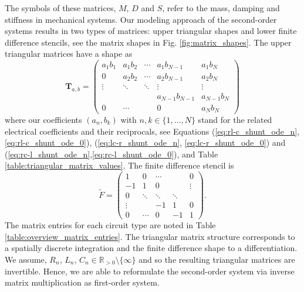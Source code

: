 \documentclass[a4paper, 10pt, twoside, twocolumn]{scrartcl}
\begin{document}
The symbols of these matrices, $M$, $D$ and $S$, refer to the mass, damping and stiffness in mechanical systems. Our modeling approach of the second-order systems results in two types of matrices: upper triangular shapes and lower finite difference stencils, see the matrix shapes in Fig. \ref{fig:matrix_shapes}. The upper triangular matrices have a shape as
\begin{equation}
	\mathbf{T}_{a,b} = 
	\begin{pmatrix}
		a_{1} b_{1} & a_{1} b_{2} & \cdots &  a_{1} b_{N-1} & a_{1} b_{N} \\
		0 			& a_{2} b_{2} & \cdots &  a_{2} b_{N-1} & a_{2} b_{N} \\
		\vdots			& \ddots	  & \ddots &  \vdots        & 	\vdots	  \\
		&			  &        & a_{N-1} b_{N-1}& a_{N-1} b_{N} \\
		0			&	\cdots		  &        &	0            & a_{N} b_{N} 
	\end{pmatrix}
	\label{eq:triangular_matrix} 
\end{equation}
where our coefficients $(a_{n}, b_{k})$ with $n,k \in \{1,\ldots,N\}$ stand for the related electrical coefficients and their reciprocals, see Equations (\ref{eq:rl-c_shunt_ode_n}, \ref{eq:rl-c_shunt_ode_0}), (\ref{eq:lc-r_shunt_ode_n}, \ref{eq:lc-r_shunt_ode_0}) and (\ref{eq:rc-l_shunt_ode_n},\ref{eq:rc-l_shunt_ode_0}), and Table \ref{table:triangular_matrix_values}. The finite difference stencil is
\begin{equation*}
	\tilde{F} = 
	\begin{pmatrix}
		1 & 0 & \cdots &  &  0\\
		-1 			& 1 & 0 &   & \vdots  \\
		0 & \ddots	  & \ddots & \ddots  & 	 \\
		\vdots &			  &     -1  & 1 &  0 \\
		0 &	\cdots		  &     0   & -1  & 1 
	\end{pmatrix} 
	\textbf{.}
	\label{eq:finite_diff_stencil} 
\end{equation*}
The matrix entries for each circuit type are noted in Table \ref{table:overview_matrix_entries}. The triangular matrix structure corresponds to a spatially discrete integration and the finite difference shape to a differentiation.  We assume, $R_{n}$, $L_{n}$, $C_{n} \in \mathbb{R}_{>0} \setminus \{\infty\}$ and so the resulting triangular matrices are invertible. Hence, we are able to reformulate the second-order system via inverse matrix multiplication as first-order system. 
\end{document}
